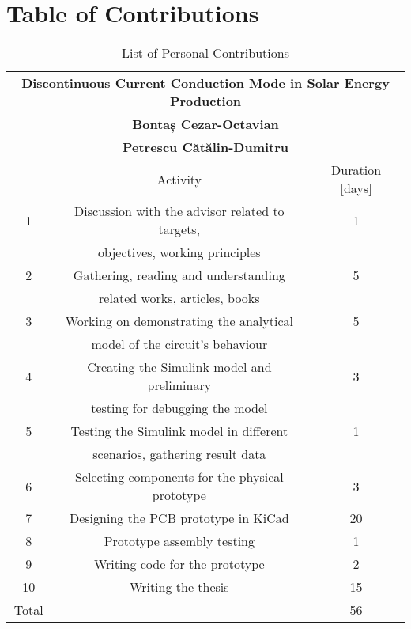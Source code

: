 \chapter{Table of Contributions}
\label{chap:contributions}

\begin{table}[ht!]
\begin{tabular}{|c|c|c|}
\hline
\multicolumn{3}{|c|}{\textbf{Discontinuous Current Conduction Mode in Solar Energy Production}} \\
\multicolumn{3}{|c|}{\textbf{Bontaș Cezar-Octavian}} \\
\multicolumn{3}{|c|}{\textbf{Petrescu Cătălin-Dumitru}} \\
\hline
 & Activity & Duration [days] \\
\hline
1 & Discussion with the advisor related to targets, & 1\\
& objectives, working principles & \\
\hline
2 & Gathering, reading and understanding & 5\\
& related works, articles, books & \\
\hline
3 & Working on demonstrating the analytical & 5\\
& model of the circuit's behaviour &\\
\hline
4 & Creating the Simulink model and preliminary & 3\\
& testing for debugging the model & \\
\hline
5 & Testing the Simulink model in different & 1\\
& scenarios, gathering result data & \\
\hline
6 & Selecting components for the physical prototype& 3\\
\hline
7 & Designing the PCB prototype in KiCad& 20\\
\hline
8 & Prototype assembly testing & 1\\
\hline
9 & Writing code for the prototype & 2\\
\hline
10 & Writing the thesis& 15\\
\hline
Total & & 56 \\
\hline
\end{tabular}
\centering
\caption{List of Personal Contributions}
\label{tab:contrib_list}
\end{table}